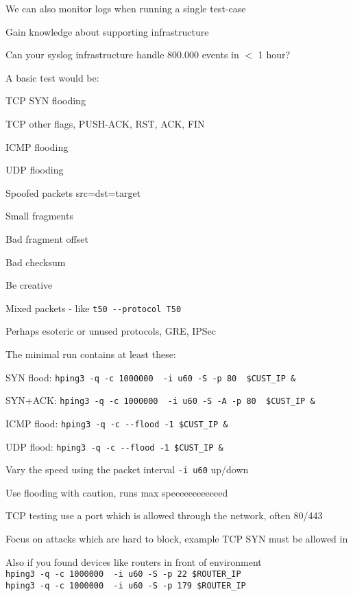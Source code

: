 \documentclass[Screen16to9,17pt]{foils}
\begin{document}
\begin{list2}
\item We can also monitor logs when running a single test-case
\item Gain knowledge about supporting infrastructure
\item Can your syslog infrastructure handle 800.000 events in $<$ 1 hour?
\end{list2}



A basic test would be:
\begin{list2}
\item TCP SYN flooding
\item TCP other flags, PUSH-ACK, RST, ACK, FIN
\item ICMP flooding
\item UDP flooding
\item Spoofed packets src=dst=target \smiley
\item Small fragments
\item Bad fragment offset
\item Bad checksum
\item Be creative
\item Mixed packets - like \verb+t50 --protocol T50+
\item Perhaps esoteric or unused protocols, GRE, IPSec
\end{list2}


\begin{list1}
\item The minimal run contains at least these:
\begin{list2}
\item SYN flood: \verb+hping3 -q -c 1000000  -i u60 -S -p 80  $CUST_IP &+
\item SYN+ACK: \verb+hping3 -q -c 1000000  -i u60 -S -A -p 80  $CUST_IP &+
\item ICMP flood: \verb+hping3 -q -c --flood -1 $CUST_IP &+
\item UDP flood: \verb+hping3 -q -c --flood -1 $CUST_IP &+
\end{list2}
\item Vary the speed using the packet interval \verb+-i u60+ up/down
\item Use flooding with caution, runs max speeeeeeeeeeeed \smiley
\item TCP testing use a port which is allowed through the network, often 80/443
\item Focus on attacks which are hard to block, example TCP SYN must be allowed in
\item Also if you found devices like routers in front of environment\\
\verb+hping3 -q -c 1000000  -i u60 -S -p 22 $ROUTER_IP+\\
\verb+hping3 -q -c 1000000  -i u60 -S -p 179 $ROUTER_IP+
\end{list1}
\end{document}
